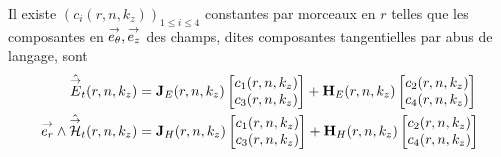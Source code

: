     \begin{prop}
      Il existe \((c_i(r,n,k_z))_{1\le i\le 4}\) constantes par morceaux en \(r\) telles que les composantes en \({\overset{\rightarrow}{e_\theta}},{\overset{\rightarrow}{e_z}}\) des champs, dites composantes tangentielles par abus de langage, sont
      \begin{subequations}
        \begin{align}
          \hat {{\overset{\rightarrow}{E}}}_t(r,n,k_z) &= \mathbf{J}_{E}(r,n,k_z)
          \begin{bmatrix}
            c_1(r,n,k_z) \\
            c_3(r,n,k_z)
          \end{bmatrix}
          +
          \mathbf{H}_{E}(r,n,k_z)
          \begin{bmatrix}
            c_2(r,n,k_z) \\
            c_4(r,n,k_z)
          \end{bmatrix}
          \label{eq:imp_fourier:cylindre:Et}
          \\
          {\overset{\rightarrow}{e_r}}\wedge\hat {{\overset{\rightarrow}{\mathcal{H}}}}_t(r,n,k_z) &=
          \mathbf{J}_{H}(r,n,k_z)
          \begin{bmatrix}
            c_1(r,n,k_z) \\
            c_3(r,n,k_z)
          \end{bmatrix}
          +
          \mathbf{H}_{H}(r,n,k_z)
          \begin{bmatrix}
            c_2(r,n,k_z) \\
            c_4(r,n,k_z)
          \end{bmatrix}
          \label{eq:imp_fourier:cylindre:Ht}
        \end{align}
      \end{subequations}
    \end{prop}


